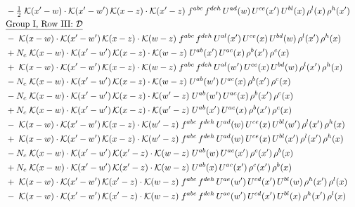 \documentclass[9pt]{article}
\begin{document}
\begin{align}
&\quad -\tfrac{1}{2}\;\mathcal{K}(x'-w)\cdot\mathcal{K}(x'-w')\,\mathcal{K}(x-z)\cdot\mathcal{K}(x'-z)\;f^{abc}\,f^{deh}\,U^{ad}(w)\,U^{ce}(x')\,U^{bl}(x)\,\rho^{l}(x)\,\rho^{h}(x')\notag\\
&\quad\underline{\text{Group I, Row III: $\mathcal D$}}\notag\\
&\quad -\;\mathcal{K}(x-w)\cdot\mathcal{K}(x'-w')\,\mathcal{K}(x-z)\cdot\mathcal{K}(w-z)\;f^{abc}\,f^{deh}\,U^{al}(x')\,U^{ce}(x)\,U^{bd}(w)\,\rho^{l}(x')\,\rho^{h}(x)\notag\\
&\quad +N_c\;\mathcal{K}(x-w)\cdot\mathcal{K}(x'-w')\,\mathcal{K}(x-z)\cdot\mathcal{K}(w-z)\;U^{ab}(x')\,U^{ac}(x)\,\rho^{b}(x')\,\rho^{c}(x)\notag\\
&\quad +\;\mathcal{K}(x-w)\cdot\mathcal{K}(x'-w')\,\mathcal{K}(x-z)\cdot\mathcal{K}(w-z)\;f^{abc}\,f^{deh}\,U^{al}(w')\,U^{ce}(x)\,U^{bd}(w)\,\rho^{l}(x')\,\rho^{h}(x)\notag\\
&\quad -N_c\;\mathcal{K}(x-w)\cdot\mathcal{K}(x'-w')\,\mathcal{K}(x-z)\cdot\mathcal{K}(w-z)\;U^{ab}(w')\,U^{ac}(x)\,\rho^{b}(x')\,\rho^{c}(x)\notag\\
&\quad -N_c\;\mathcal{K}(x-w)\cdot\mathcal{K}(x'-w')\,\mathcal{K}(x-z)\cdot\mathcal{K}(w'-z)\;U^{ab}(w')\,U^{ac}(x)\,\rho^{b}(x')\,\rho^{c}(x)\notag\\
&\quad +N_c\;\mathcal{K}(x-w)\cdot\mathcal{K}(x'-w')\,\mathcal{K}(x-z)\cdot\mathcal{K}(w'-z)\;U^{ab}(x')\,U^{ac}(x)\,\rho^{b}(x')\,\rho^{c}(x)\notag\\
&\quad -\;\mathcal{K}(x-w)\cdot\mathcal{K}(x'-w')\,\mathcal{K}(x-z)\cdot\mathcal{K}(w'-z)\;f^{abc}\,f^{deh}\,U^{ad}(w)\,U^{ce}(x)\,U^{bl}(w')\,\rho^{l}(x')\,\rho^{h}(x)\notag\\
&\quad +\;\mathcal{K}(x-w)\cdot\mathcal{K}(x'-w')\,\mathcal{K}(x-z)\cdot\mathcal{K}(w'-z)\;f^{abc}\,f^{deh}\,U^{ad}(w)\,U^{ce}(x)\,U^{bl}(x')\,\rho^{l}(x')\,\rho^{h}(x)\notag\\
&\quad -N_c\;\mathcal{K}(x-w)\cdot\mathcal{K}(x'-w')\,\mathcal{K}(x'-z)\cdot\mathcal{K}(w-z)\;U^{ab}(w)\,U^{ac}(x')\,\rho^{c}(x')\,\rho^{b}(x)\notag\\
&\quad +N_c\;\mathcal{K}(x-w)\cdot\mathcal{K}(x'-w')\,\mathcal{K}(x'-z)\cdot\mathcal{K}(w-z)\;U^{ab}(x)\,U^{ac}(x')\,\rho^{c}(x')\,\rho^{b}(x)\notag\\
&\quad +\;\mathcal{K}(x-w)\cdot\mathcal{K}(x'-w')\,\mathcal{K}(x'-z)\cdot\mathcal{K}(w-z)\;f^{abc}\,f^{deh}\,U^{ae}(w')\,U^{cd}(x')\,U^{bl}(w)\,\rho^{h}(x')\,\rho^{l}(x)\notag\\
&\quad -\;\mathcal{K}(x-w)\cdot\mathcal{K}(x'-w')\,\mathcal{K}(x'-z)\cdot\mathcal{K}(w-z)\;f^{abc}\,f^{deh}\,U^{ae}(w')\,U^{cd}(x')\,U^{bl}(x)\,\rho^{h}(x')\,\rho^{l}(x)\notag\\

\end{align}
\end{document}
